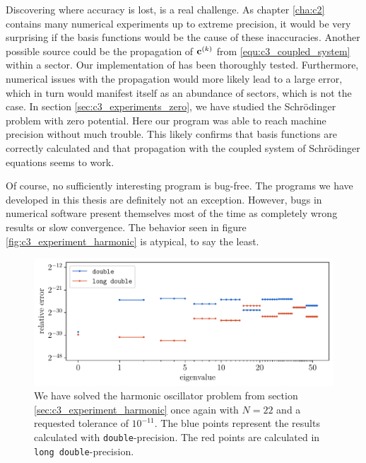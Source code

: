 Discovering where accuracy is lost, is a real challenge. As chapter \ref{cha:c2} contains many numerical experiments up to extreme precision, it would be very surprising if the basis functions would be the cause of these inaccuracies. Another possible source could be the propagation of $\vb{c}^{(k)}$ from \eqref{equ:c3_coupled_system} within a sector. Our implementation of \matscs{} has been thoroughly tested. Furthermore, numerical issues with the propagation would more likely lead to a large error, which in turn would manifest itself as an abundance of sectors, which is not the case. In section \ref{sec:c3_experiments_zero}, we have studied the Schrödinger problem with zero potential. Here our program was able to reach machine precision without much trouble. This likely confirms that basis functions are correctly calculated and that propagation with the coupled system of Schrödinger equations seems to work.

Of course, no sufficiently interesting program is bug-free. The programs we have developed in this thesis are definitely not an exception. However, bugs in numerical software present themselves most of the time as completely wrong results or slow convergence. The behavior seen in figure \ref{fig:c3_experiment_harmonic} is atypical, to say the least.

\begin{figure}
  \begin{center}
    \includegraphics[width=\textwidth]{img/chapter3/experiments/harmonic_analysis.pdf}
    \caption{We have solved the harmonic oscillator problem from section \ref{sec:c3_experiment_harmonic} once again with $N = 22$ and a requested tolerance of $10^{-11}$. The blue points represent the results calculated with \texttt{double}-precision. The red points are calculated in \texttt{long double}-precision.}\label{fig:c3_harmonic_analysis}
  \end{center}
\end{figure}

